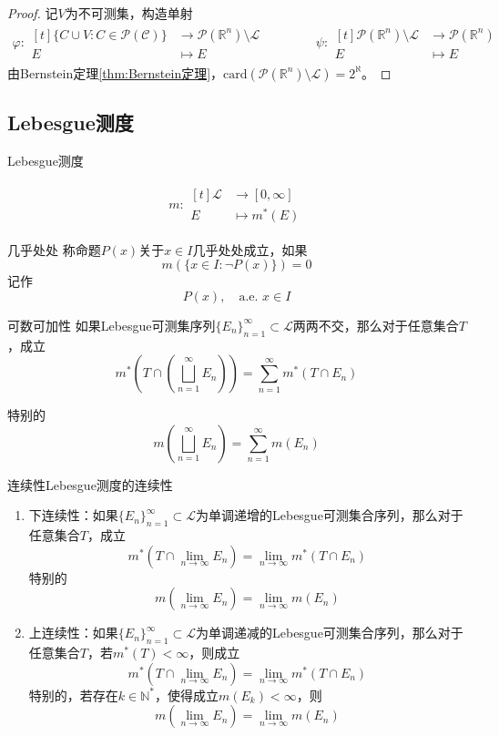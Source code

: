 \documentclass[lang = cn, scheme = chinese, thmcnt = section]{elegantbook}
\newcommand{\N}{\mathbb{N}}            %
\newcommand{\R}{\mathbb{R}}            %
\newcommand{\sub}{\subset}             %
\newcommand{\function}[5]{
	\begin{align*}
		#1:\begin{aligned}[t]
			#2 &\longrightarrow #3\\
			#4 &\longmapsto #5
		\end{aligned}
	\end{align*}
}                                     %
\begin{document}
\begin{proof}
	记$V$为不可测集，构造单射
	\begin{align*}
		\varphi:\begin{aligned}[t]
			\{ C\cup V:C\in \mathscr{P}(\mathcal{C}) \}&\longrightarrow \mathscr{P}(\R^n)\setminus\mathscr{L}\\
			E &\longmapsto E
		\end{aligned}
		\qquad\qquad
		\psi:\begin{aligned}[t]
			\mathscr{P}(\R^n)\setminus\mathscr{L} &\longrightarrow \mathscr{P}(\R^n)\\
			E &\longmapsto E
		\end{aligned}
	\end{align*}
	由Bernstein定理\ref{thm:Bernstein定理}，$\text{card}(\mathscr{P}(\R^n)\setminus\mathscr{L})=2^{\aleph}$。
\end{proof}

\subsection{Lebesgue测度}

\begin{definition}{Lebesgue测度}
	\function{m}{\mathscr{L}}{[0,\infty]}{E}{m^*(E)}
\end{definition}

\begin{definition}{几乎处处}
	称命题$P(x)$关于$x\in I$几乎处处成立，如果
	$$
	m(\{ x\in I:\neg P(x) \})=0
	$$
	记作
	$$
	P(x),\quad \text{a.e. } x\in I
	$$
\end{definition}

\begin{theorem}{可数可加性}
	如果Lebesgue可测集序列$\{E_n\}_{n=1}^{\infty}\sub\mathscr{L}$两两不交，那么对于任意集合$T$，成立%
	$$
	m^*\left(T\cap\left(\bigsqcup_{n=1}^{\infty}{E_n}\right)\right)=\sum_{n=1}^{\infty}{m^*(T\cap E_n)}
	$$
	
	特别的
	$$
	m\left(\bigsqcup_{n=1}^{\infty}{E_n}\right)=\sum_{n=1}^{\infty}{m(E_n)}
	$$
\end{theorem}

\begin{theorem}{连续性}{Lebesgue测度的连续性}
	\begin{enumerate}
		\item 下连续性：如果$\{ E_n \}_{n=1}^{\infty}\sub\mathscr{L}$为单调递增的Lebesgue可测集合序列，那么对于任意集合$T$，成立
		$$
		m^*\left(T\cap\lim_{n\to\infty}{E_n}\right)=\lim_{n\to\infty}{m^*(T\cap E_n)}
		$$
		特别的
		$$
		m\left(\lim_{n\to\infty}{E_n}\right)=\lim_{n\to\infty}{m(E_n)}
		$$
		\item 上连续性：如果$\{ E_n \}_{n=1}^{\infty}\sub\mathscr{L}$为单调递减的Lebesgue可测集合序列，那么对于任意集合$T$，若$m^*(T)<\infty$，则成立
		$$
		m^*\left(T\cap\lim_{n\to\infty}{E_n}\right)=\lim_{n\to\infty}{m^*(T\cap E_n)}
		$$
		特别的，若存在$k\in\N^*$，使得成立$m(E_k)<\infty$，则
		$$
		m\left(\lim_{n\to\infty}{E_n}\right)=\lim_{n\to\infty}{m(E_n)}
		$$
	\end{enumerate}
\end{theorem}
\end{document}
